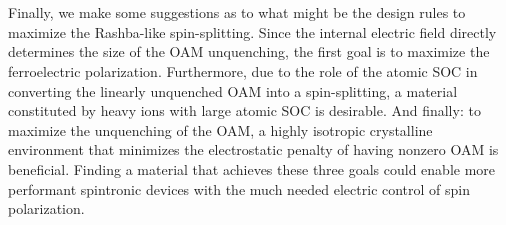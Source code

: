 \\\\
Finally, we make some suggestions as to what might be the design rules to maximize the Rashba-like spin-splitting.
Since the internal electric field directly determines the size of the OAM unquenching, the first goal is to maximize the ferroelectric polarization.
Furthermore, due to the role of the atomic SOC in converting the linearly unquenched OAM into a spin-splitting, a material constituted by heavy ions with large atomic SOC is desirable.
And finally: to maximize the unquenching of the OAM, a highly isotropic crystalline environment that minimizes the electrostatic penalty of having nonzero OAM is beneficial.
Finding a material that achieves these three goals could enable more performant spintronic devices with the much needed electric control of spin polarization.
